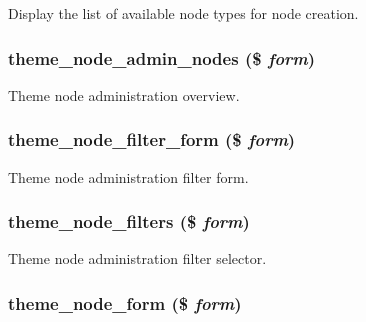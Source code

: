 Display the list of available node types for node creation. \hypertarget{group__themeable_g2601e8db30df61b351801e91a3de55b6}{
\subsubsection[{theme\_\-node\_\-admin\_\-nodes}]{\setlength{\rightskip}{0pt plus 5cm}theme\_\-node\_\-admin\_\-nodes (\$ {\em form})}}
\label{group__themeable_g2601e8db30df61b351801e91a3de55b6}


Theme node administration overview. \hypertarget{group__themeable_gacf4ca3e12603e4d519b6313276e761e}{
\subsubsection[{theme\_\-node\_\-filter\_\-form}]{\setlength{\rightskip}{0pt plus 5cm}theme\_\-node\_\-filter\_\-form (\$ {\em form})}}
\label{group__themeable_gacf4ca3e12603e4d519b6313276e761e}


Theme node administration filter form. \hypertarget{group__themeable_g8c9a4c2c680b412160c95515eb9b4c7b}{
\subsubsection[{theme\_\-node\_\-filters}]{\setlength{\rightskip}{0pt plus 5cm}theme\_\-node\_\-filters (\$ {\em form})}}
\label{group__themeable_g8c9a4c2c680b412160c95515eb9b4c7b}


Theme node administration filter selector. \hypertarget{group__themeable_g446a4c85c20acb7a6447d0acbe0d0210}{
\subsubsection[{theme\_\-node\_\-form}]{\setlength{\rightskip}{0pt plus 5cm}theme\_\-node\_\-form (\$ {\em form})}}
\label{group__themeable_g446a4c85c20acb7a6447d0acbe0d0210}


